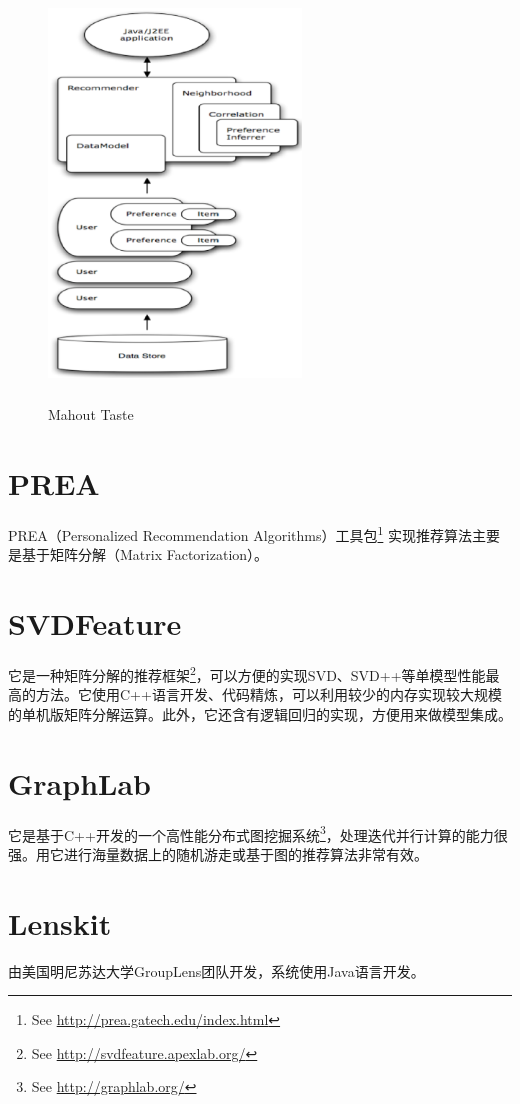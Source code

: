\begin{figure}[ht]
  \centering
  \includegraphics[width=0.6\textwidth,height=11cm]{figures/taste.eps}
  \caption{Mahout Taste}\label{fig:taste}
\end{figure}

\section{PREA}
PREA（Personalized Recommendation Algorithms）工具包\footnote{See \url{http://prea.gatech.edu/index.html}} 实现推荐算法主要是基于矩阵分解（Matrix Factorization）。

\section{SVDFeature}
它是一种矩阵分解的推荐框架\footnote{See \url{http://svdfeature.apexlab.org/}}，可以方便的实现SVD、SVD++等单模型性能最高的方法。它使用C++语言开发、代码精炼，可以利用较少的内存实现较大规模的单机版矩阵分解运算。此外，它还含有逻辑回归的实现，方便用来做模型集成。

\section{GraphLab}
它是基于C++开发的一个高性能分布式图挖掘系统\footnote{See \url{http://graphlab.org/}}，处理迭代并行计算的能力很强。用它进行海量数据上的随机游走或基于图的推荐算法非常有效。

\section{Lenskit}
由美国明尼苏达大学GroupLens团队开发，系统使用Java语言开发。

